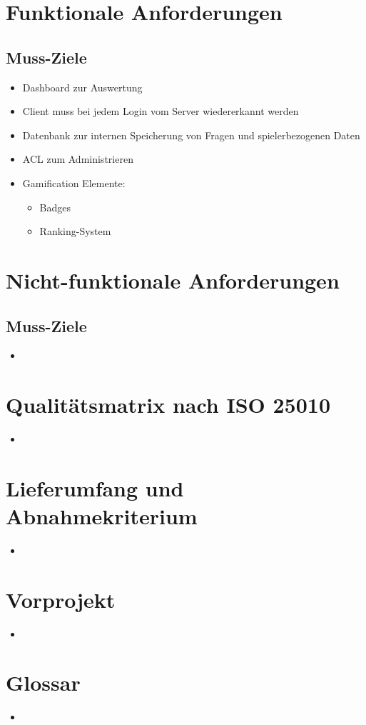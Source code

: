 \documentclass[11pt,a4paper]{scrreprt}
\begin{document}
\chapter{Funktionale Anforderungen}
\section{Muss-Ziele}
\begin{itemize}
\item Dashboard zur Auswertung
\item Client muss bei jedem Login vom Server wiedererkannt werden
\item Datenbank zur internen Speicherung von Fragen und spielerbezogenen Daten
\item ACL zum Administrieren
\item Gamification Elemente:
\begin{itemize}
\item Badges
\item Ranking-System
\end{itemize}
\end{itemize}

\chapter{Nicht-funktionale Anforderungen}
\section{Muss-Ziele}
\begin{itemize}
\item 
\end{itemize}

\chapter{Qualitätsmatrix nach ISO 25010}
\begin{itemize}
\item
\end{itemize}

\chapter{Lieferumfang und Abnahmekriterium}
\begin{itemize}
\item
\end{itemize}

\chapter{Vorprojekt}
\begin{itemize}
\item
\end{itemize}

\chapter{Glossar}
\begin{itemize}
\item
\end{itemize}
\end{document}
